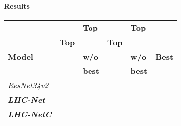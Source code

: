 \documentclass[fleqn,10pt]{SelfArx}
\begin{document}
\paragraph{Results}
\begin{center}
\begin{tabular}{||p{1.58cm} | p{0.85cm} | p{0.85cm} | p{0.85cm} | p{0.85cm} | p{0.85cm}||}  
 \hline
                      &                                                & \hspace{0.15cm}\textbf{Top}         &                                                    &\hspace{0.08cm} \textbf{Top}                             &  \\ 
                      &\hspace{0.1cm} \textbf{Top}        & \hspace{0.15cm} & \hspace{0.15cm}\textbf{Top}           &\hspace{0.08cm}                     &\\
\hspace{0.35cm}\textbf{Model}                      &\hspace{0.1cm}  & \hspace{0.15cm}\textbf{w/o}         & \hspace{0.15cm}   &\hspace{0.08cm} \textbf{w/o}                            & \hspace{0.03cm} \textbf{Best}\\
                      &                                                & \hspace{0.15cm}\textbf{best}         &                                                    &\hspace{0.14cm}\textbf{best}                            &\\
 \hline
 \hline
\textit{ResNet34v2} &  &  &  &  & \\
 \hline
 \hline
\textbf{\textit{LHC-Net}} &  &  &  &  & \\
 \hline
 \hline
\textbf{\textit{LHC-NetC}} &  &  &  &  & \\
 \hline
\end{tabular}
\end{center}
\end{document}
